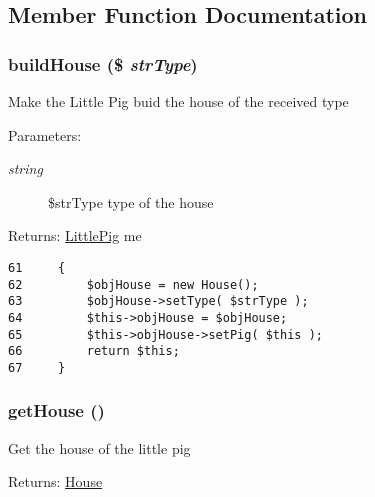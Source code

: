 \subsection{Member Function Documentation}
\hypertarget{class_little_pig_082ad68f4d76b0c185027dcbf3a4dc42}{
\subsubsection[{buildHouse}]{\setlength{\rightskip}{0pt plus 5cm}buildHouse (\$ {\em strType})}}
\label{class_little_pig_082ad68f4d76b0c185027dcbf3a4dc42}


Make the Little Pig buid the house of the received type

\begin{Desc}
\item[Parameters:]
\begin{description}
\item[{\em string}]\$strType type of the house \end{description}
\end{Desc}
\begin{Desc}
\item[Returns:]\hyperlink{class_little_pig}{LittlePig} me \end{Desc}


\begin{Code}\begin{verbatim}61     {
62         $objHouse = new House();
63         $objHouse->setType( $strType );
64         $this->objHouse = $objHouse;
65         $this->objHouse->setPig( $this );
66         return $this;
67     }
\end{verbatim}
\end{Code}


\hypertarget{class_little_pig_24a3c5baa4accd4da966da7437d92a6d}{
\subsubsection[{getHouse}]{\setlength{\rightskip}{0pt plus 5cm}getHouse ()}}
\label{class_little_pig_24a3c5baa4accd4da966da7437d92a6d}


Get the house of the little pig

\begin{Desc}
\item[Returns:]\hyperlink{class_house}{House} \end{Desc}


